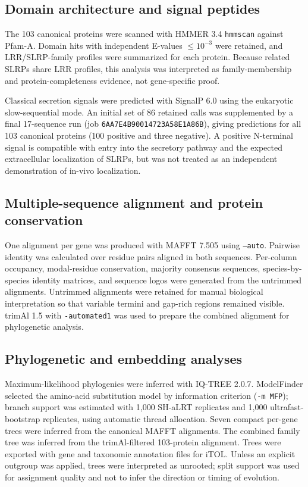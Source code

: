 \subsection{Domain architecture and signal peptides}
\label{subsec:domain-signalp}

The 103 canonical proteins were scanned with HMMER 3.4 \texttt{hmmscan} against
Pfam-A. Domain hits with independent E-values $\leq 10^{-3}$ were retained, and
LRR/SLRP-family profiles were summarized for each protein. Because related SLRPs
share LRR profiles, this analysis was interpreted as family-membership and
protein-completeness evidence, not gene-specific proof.

Classical secretion signals were predicted with SignalP 6.0 using the eukaryotic
slow-sequential mode. An initial set of 86 retained calls was supplemented by a
final 17-sequence run (job \texttt{6AA7E4B90014723A58E1A86B}), giving predictions
for all 103 canonical proteins (100 positive and three negative). A positive
N-terminal signal is compatible with entry into the
secretory pathway and the expected extracellular localization of SLRPs, but was
not treated as an independent demonstration of in-vivo localization.

\subsection{Multiple-sequence alignment and protein conservation}
\label{subsec:multiple-sequence-alignment}

One alignment per gene was produced with MAFFT 7.505 using
\texttt{--auto}. Pairwise identity was calculated over residue pairs aligned in
both sequences. Per-column occupancy, modal-residue conservation, majority
consensus sequences, species-by-species identity matrices, and sequence logos
were generated from the untrimmed alignments. Untrimmed alignments were retained
for manual biological interpretation so that variable termini and gap-rich
regions remained visible. trimAl 1.5 with \texttt{-automated1} was used to
prepare the combined alignment for phylogenetic analysis.

\subsection{Phylogenetic and embedding analyses}
\label{subsec:phylogenetic-analysis}

Maximum-likelihood phylogenies were inferred with IQ-TREE 2.0.7. ModelFinder
selected the amino-acid substitution model by information criterion
(\texttt{-m MFP}); branch support was estimated with 1,000 SH-aLRT replicates
and 1,000 ultrafast-bootstrap replicates, using automatic thread allocation.
Seven compact per-gene trees were inferred from the canonical MAFFT alignments.
The combined family tree was inferred from the trimAl-filtered 103-protein
alignment. Trees were exported with gene and taxonomic annotation files for
iTOL. Unless an explicit outgroup was applied, trees were interpreted as
unrooted; split support was used for assignment quality and not to infer the
direction or timing of evolution.

